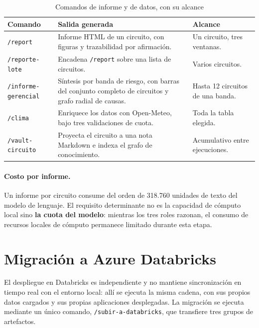 \documentclass[11pt,a4paper]{article}
\begin{document}
\begin{table}[H]
\centering
\caption{Comandos de informe y de datos, con su alcance}
\label{tab:comandosinforme}
\small
\begin{tabularx}{\textwidth}{L{3.4cm} X L{4.0cm}}
\toprule
\textbf{Comando} & \textbf{Salida generada} & \textbf{Alcance} \\
\midrule
\texttt{/report} & Informe HTML de un circuito, con figuras y trazabilidad por afirmación. & Un circuito, tres ventanas. \\
\texttt{/reporte-lote} & Encadena \texttt{/report} sobre una lista de circuitos. & Varios circuitos. \\
\texttt{/informe-gerencial} & Síntesis por banda de riesgo, con barras del conjunto completo de circuitos y grafo radial de causas. & Hasta 12 circuitos de una banda. \\
\texttt{/clima} & Enriquece los datos con Open-Meteo, bajo tres validaciones de cuota. & Toda la tabla elegida. \\
\texttt{/vault-circuito} & Proyecta el circuito a una nota Markdown e indexa el grafo de conocimiento. & Acumulativo entre ejecuciones. \\
\bottomrule
\end{tabularx}
\end{table}

\paragraph{Costo por informe.} Un informe por circuito consume del orden de 318.760 unidades de
texto del modelo de lenguaje. El requisito determinante no es la capacidad de cómputo local sino
\textbf{la cuota del modelo}: mientras los tres roles razonan, el consumo de recursos locales
de cómputo permanece limitado durante esta etapa.

\section{Migración a Azure Databricks}
\label{sec:databricks}

El despliegue en Databricks es independiente y no mantiene sincronización en tiempo real con el
entorno local: allí se ejecuta la misma cadena, con sus propios datos cargados y sus propias
aplicaciones desplegadas. La migración se ejecuta mediante un único comando,
\texttt{/subir-a-databricks}, que transfiere tres grupos de artefactos.
\end{document}
